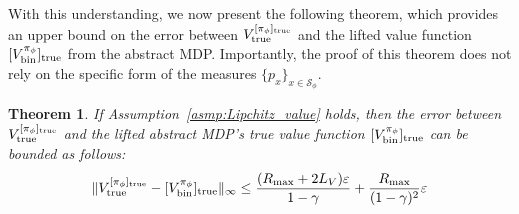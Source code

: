 \documentclass[twoside]{article}
\newtheorem{theorem}{Theorem}
\newcommand{\CAL}[1]{\mathcal{#1}}
\begin{document}
With this understanding, we now present the following theorem, which provides an upper bound on the error between ${V}^{[\pi_\phi]_{\rm true}}_{\rm true}$ and the lifted value function $[{V}_{{\rm bin}}^{\pi_\phi}]_{\rm true}$ from the abstract MDP. Importantly, the proof of this theorem does not rely on the specific form of the measures $\{p_x\}_{x\in\CAL{S}_\phi}$.
    \begin{theorem}\label{Thm:4-17}
    If Assumption~\ref{asmp:Lipchitz_value} holds, then the error between ${V}^{[\pi_\phi]_{\rm true}}_{\rm true}$ and the lifted abstract MDP’s true value function $[{V}_{{\rm bin}}^{\pi_\phi}]_{\rm true}$ can be bounded as follows: 
        \begin{align}
            \|{V}^{[\pi_\phi]_{\rm true}}_{\rm true}-[{V}^{\pi_\phi}_{\rm bin}]_{\rm true}\|_\infty\leq \frac{(R_{\rm max}+2L_V)\varepsilon}{1-\gamma}+\frac{R_{\rm max}}{(1-\gamma)^2}\varepsilon
        \end{align}
    \end{theorem}
\end{document}

